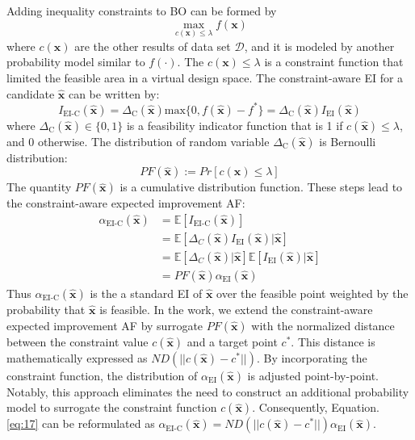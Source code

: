 \documentclass[preprint,review,12pt,authoryear]{elsarticle}
\begin{document}
Adding inequality constraints to BO can be formed by
\begin{equation}
\max_{c(\boldsymbol{x}) \leq \lambda} f(\boldsymbol{x})
\label{eq:11}
\end{equation}
where $c(\boldsymbol{x})$ are the other results of data set $\mathcal{D}$, and it is modeled by another probability model similar to $f(\cdot)$. The $c(\boldsymbol{x})\leq \lambda$ is a constraint function that limited the feasible area in a virtual design space. The constraint-aware EI for a candidate $\hat{\boldsymbol{x}}$ can be written by:
\begin{equation}
I_{\text{EI-C}}(\hat{\boldsymbol{x}})=\Delta_\text{C}(\hat{\boldsymbol{x}})\text{max}\{0, f(\hat{\boldsymbol{x}})-f^*\}=\Delta_\text{C}(\hat{\boldsymbol{x}})I_{\text{EI}}(\hat{\boldsymbol{x}})
    \label{eq:12}
\end{equation}
where $\Delta_\text{C}(\hat{\boldsymbol{x}})\in \{0,1\}$ is a feasibility indicator function that is 1 if $c(\hat{\boldsymbol{x}})\leq \lambda$, and 0 otherwise. 
The distribution of random variable $\Delta_\text{C}(\hat{\boldsymbol{x}})$ is Bernoulli distribution:
\begin{equation}
    PF(\hat{\boldsymbol{x}}):=Pr[c(\boldsymbol{x})\leq \lambda] 
    \label{eq:13}
\end{equation}
The quantity $PF(\hat{\boldsymbol{x}})$ is a cumulative distribution function. These steps lead to the  constraint-aware expected improvement AF:
\begin{equation}
\begin{aligned}
\alpha_{\text{EI-C}}(\hat{\boldsymbol{x}}) &=\mathbb{E}[I_\text{EI-C}(\hat{\boldsymbol{x}})]\\
&= \mathbb{E}[\Delta_{C}(\hat{\boldsymbol{x}})I_{\text{EI}}(\hat{\boldsymbol{x}})|\hat{\boldsymbol{x}}]\\
&= \mathbb{E}[\Delta_{C}(\hat{\boldsymbol{x}})|\hat{\boldsymbol{x}}]\mathbb{E}[I_\text{EI}(\hat{\boldsymbol{x}})|\hat{\boldsymbol{x}}]\\
&=PF(\hat{\boldsymbol{x}})\alpha_{\text{EI}}(\hat{\boldsymbol{x}})
\end{aligned}
\label{eq:14}
\end{equation}
Thus $\alpha_{\text{EI-C}}(\hat{\boldsymbol{x}})$ is the a standard EI of $\hat{\boldsymbol{x}}$ over the feasible point weighted by the probability that $\hat{\boldsymbol{x}}$ is feasible. In the work, we extend the constraint-aware expected improvement AF by surrogate $PF(\hat{\boldsymbol{x}})$ with the normalized distance between the constraint value $c(\hat{\boldsymbol{x}})$ and a target point $c^*$. This distance is mathematically expressed as $ND(||c(\hat{\boldsymbol{x}})-c^*||)$. By incorporating the constraint function, the distribution of \(\alpha_{\text{EI}}(\hat{\boldsymbol{x}})\) is adjusted point-by-point. Notably, this approach eliminates the need to construct an additional probability model to surrogate the constraint function $c(\hat{\boldsymbol{x}}) $. Consequently, Equation. \ref{eq:17} can be reformulated as $\alpha_{\text{EI-C}}(\hat{\boldsymbol{x}}) =ND(||c(\hat{\boldsymbol{x}})-c^*||)\alpha_{\text{EI}}(\hat{\boldsymbol{x}})
$. 
\end{document}
